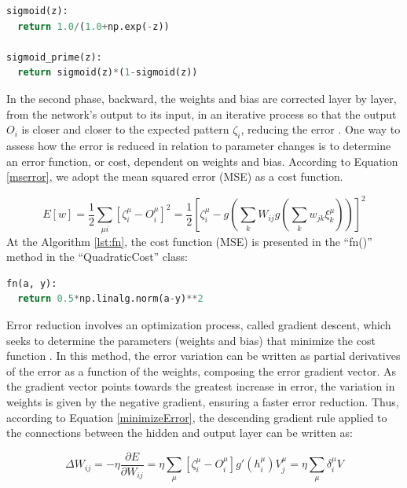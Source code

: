 \begin{lstlisting}[caption={Delta method in Python},label={lst:sigmoid},language=Python]
sigmoid(z):
  return 1.0/(1.0+np.exp(-z))
 
sigmoid_prime(z):
  return sigmoid(z)*(1-sigmoid(z))
\end{lstlisting}

In the second phase, backward, the weights and bias are corrected layer by layer, from the network's output to its input, in an iterative process so that the output $O_i$ is closer and closer to the expected pattern $\zeta_i$, reducing the error \cite{haykin1999}. One way to assess how the error is reduced in relation to parameter changes is to determine an error function, or cost, dependent on weights and bias. According to Equation \ref{mserror}, we adopt the mean squared error (MSE) as a cost function.

\begin{equation}
\label{mserror}
E[w]=\frac{1}{2}\sum_{\mu i}[\zeta_i^\mu-O_i^\mu]^2 = \frac{1}{2}[\zeta_i^\mu - g(\sum_kW_{ij}g(\sum_kw_{jk}\xi_k^\mu))]^2
\end{equation}
At the Algorithm \ref{lst:fn}, the cost function (MSE) is presented in the “fn()” method in the “QuadraticCost” class:

\begin{lstlisting}[caption={Delta method in Python},label={lst:fn},language=Python]
fn(a, y):
  return 0.5*np.linalg.norm(a-y)**2
\end{lstlisting}



Error reduction involves an optimization process, called gradient descent, which seeks to determine the parameters (weights and bias) that minimize the cost function \cite{nielsen2015}. In this method, the error variation can be written as partial derivatives of the error as a function of the weights, composing the error gradient vector. As the gradient vector points towards the greatest increase in error, the variation in weights is given by the negative gradient, ensuring a faster error reduction. Thus, according to Equation \ref{minimizeError}, the descending gradient rule applied to the connections between the hidden and output layer can be written as:

\begin{equation}
\label{minimizeError}
\Delta W_{ij}=-\eta\frac{\partial E}{\partial W_{ij}}=\eta\sum_\mu[\zeta_i^\mu-O_i^\mu]g'(h_i^\mu)V_j^\mu=\eta\sum_\mu\delta_i^\mu V
\end{equation}

